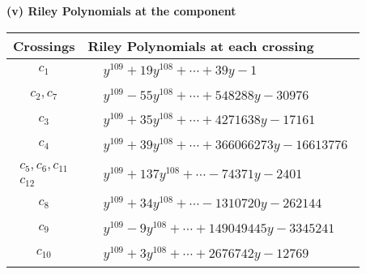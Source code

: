 \documentclass[1p]{elsarticle_modified}
\theoremstyle{definition}
\begin{document}
\newpage\renewcommand{\arraystretch}{1}
\flushleft \textbf{(v) Riley Polynomials at the component}\newline \\
\begin{tabular}{m{50pt}|m{274pt}}
Crossings & \hspace{64pt}Riley Polynomials at each crossing \\
\hline $$\begin{aligned}c_{1}\end{aligned}$$&$\begin{aligned}
&y^{109}+19 y^{108}+\cdots+39 y-1
\end{aligned}$\\
\hline $$\begin{aligned}c_{2},c_{7}\end{aligned}$$&$\begin{aligned}
&y^{109}-55 y^{108}+\cdots+548288 y-30976
\end{aligned}$\\
\hline $$\begin{aligned}c_{3}\end{aligned}$$&$\begin{aligned}
&y^{109}+35 y^{108}+\cdots+4271638 y-17161
\end{aligned}$\\
\hline $$\begin{aligned}c_{4}\end{aligned}$$&$\begin{aligned}
&y^{109}+39 y^{108}+\cdots+366066273 y-16613776
\end{aligned}$\\
\hline $$\begin{aligned}c_{5},c_{6},c_{11}\\c_{12}\end{aligned}$$&$\begin{aligned}
&y^{109}+137 y^{108}+\cdots-74371 y-2401
\end{aligned}$\\
\hline $$\begin{aligned}c_{8}\end{aligned}$$&$\begin{aligned}
&y^{109}+34 y^{108}+\cdots-1310720 y-262144
\end{aligned}$\\
\hline $$\begin{aligned}c_{9}\end{aligned}$$&$\begin{aligned}
&y^{109}-9 y^{108}+\cdots+149049445 y-3345241
\end{aligned}$\\
\hline $$\begin{aligned}c_{10}\end{aligned}$$&$\begin{aligned}
&y^{109}+3 y^{108}+\cdots+2676742 y-12769
\end{aligned}$\\
\hline
\end{tabular}\\~\\
\end{document}
